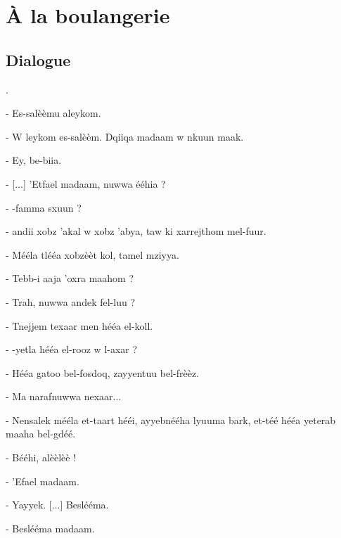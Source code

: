 \chapter{À la boulangerie}

\section{Dialogue}
.\newline

- Es-salèèmu \ca aleykom. 

- W \ca leykom es-salèèm. Dqiiqa madaam w nkuun m\ca aak.

- Ey, be\ct-\ct bii\ca a.

- [...] 'Etfa\cdh\cdh el madaam, \vs nuwwa \vs ééhia ? 

- \VS-famma sxuun ? 

- \CA andii xobz 'ak\hb al w xobz 'abya\cdh, taw ki xarrejthom mel-fuur.

- Mééla tléé\th a xobzèèt k\hb ol, ta\ca mel mziyya.

- T\hb ebb-\vs i \hb aaja 'oxra m\ca aahom ? 

- Trah, \vs nuwwa \ca andek fel-\hb luu ? 

- Tnejjem tex\ct aar men héé\dh a el-koll.

- \VS-yetla\ca{} héé\dh a el-rooz w l-ax\cdh ar ? 

- Héé\dh a gatoo bel-fosdoq, zayyentuu bel-frèèz.

- Ma na\ca raf\vs \vs nuwwa nex\ct aar...

- Nensa\hb lek mééla et-taart héé\dh i, \ct ayyebnééha lyuuma bark, et-téé héé\dh a yete\vs rab m\ca aaha bel-gdéé.

- Bééhi, a\ca lèè\vs lèè !

- 'E\ct fa\cdh\cdh el madaam.

- Y\ca ayy\vs ek. [...] Beslééma.

- Beslééma madaam.